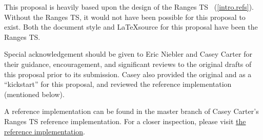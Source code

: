 \setcounter{chapter}{0}

This proposal is heavily based upon the design of the Ranges TS
~(\ref{intro.refs}). Without the Ranges TS, it would
not have been possible for this proposal to exist. Both the
document style and \LaTeX source for this proposal have been
 the Ranges TS.

Special acknowledgement should be given to Eric Niebler and Casey
Carter for their guidance, encouragement, and significant reviews
to the original drafts of this proposal prior to its submission.
Casey also provided the original  and
 as a ``kickstart'' for this proposal,
and reviewed the reference implementation (mentioned below).

\setcounter{chapter}{1}

A reference implementation can be found in the master branch of Casey Carter's Ranges TS reference
implementation. For a closer inspection, please visit
\href{https://github.com/CaseyCarter/cmcstl2/tree/master/include/stl2/detail/memory}{the reference implementation}.